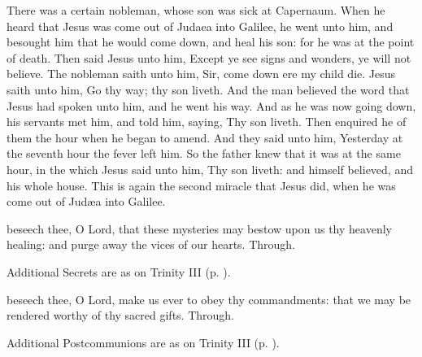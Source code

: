 
 There was a certain nobleman, whose son was sick at Capernaum. When he heard that Jesus was come out of Judaea into Galilee, he went unto him, and besought him that he would come down, and heal his son: for he was at the point of death. Then said Jesus unto him, Except ye see signs and wonders, ye will not believe. The nobleman saith unto him, Sir, come down ere my child die. Jesus saith unto him, Go thy way; thy son liveth. And the man believed the word that Jesus had spoken unto him, and he went his way. And as he was now going down, his servants met him, and told him, saying, Thy son liveth. Then enquired he of them the hour when he began to amend. And they said unto him, Yesterday at the seventh hour the fever left him. So the father knew that it was at the same hour, in the which Jesus said unto him, Thy son liveth: and himself believed, and his whole house. This is again the second miracle that Jesus did, when he was come out of Jud{\ae}a into Galilee.


\secret
{} beseech thee, O Lord, that these mysteries may bestow upon us thy heavenly healing: and purge away the vices of our hearts. Through.
\begin{rubric}
    Additional Secrets are as on Trinity III (p. \pageref{TrinityIII}).
\end{rubric}


\postcommunion
{} beseech thee, O Lord, make us ever to obey thy commandments: that we may be rendered worthy of thy sacred gifts. Through.
\begin{rubric}
    Additional Postcommunions are as on Trinity III (p. \pageref{TrinityIII}).
\end{rubric}

